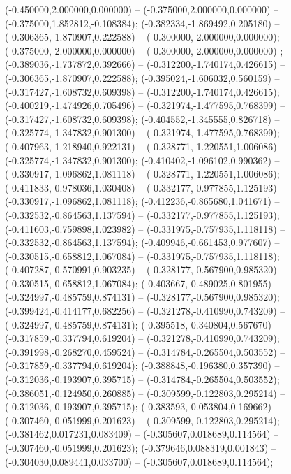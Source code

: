  (-0.450000,2.000000,0.000000) -- (-0.375000,2.000000,0.000000) -- (-0.375000,1.852812,-0.108384);
 (-0.382334,-1.869492,0.205180) -- (-0.306365,-1.870907,0.222588) -- (-0.300000,-2.000000,0.000000);
 (-0.375000,-2.000000,0.000000) -- (-0.300000,-2.000000,0.000000) ;
 (-0.389036,-1.737872,0.392666) -- (-0.312200,-1.740174,0.426615) -- (-0.306365,-1.870907,0.222588);
 (-0.395024,-1.606032,0.560159) -- (-0.317427,-1.608732,0.609398) -- (-0.312200,-1.740174,0.426615);
 (-0.400219,-1.474926,0.705496) -- (-0.321974,-1.477595,0.768399) -- (-0.317427,-1.608732,0.609398);
 (-0.404552,-1.345555,0.826718) -- (-0.325774,-1.347832,0.901300) -- (-0.321974,-1.477595,0.768399);
 (-0.407963,-1.218940,0.922131) -- (-0.328771,-1.220551,1.006086) -- (-0.325774,-1.347832,0.901300);
 (-0.410402,-1.096102,0.990362) -- (-0.330917,-1.096862,1.081118) -- (-0.328771,-1.220551,1.006086);
 (-0.411833,-0.978036,1.030408) -- (-0.332177,-0.977855,1.125193) -- (-0.330917,-1.096862,1.081118);
 (-0.412236,-0.865680,1.041671) -- (-0.332532,-0.864563,1.137594) -- (-0.332177,-0.977855,1.125193);
 (-0.411603,-0.759898,1.023982) -- (-0.331975,-0.757935,1.118118) -- (-0.332532,-0.864563,1.137594);
 (-0.409946,-0.661453,0.977607) -- (-0.330515,-0.658812,1.067084) -- (-0.331975,-0.757935,1.118118);
 (-0.407287,-0.570991,0.903235) -- (-0.328177,-0.567900,0.985320) -- (-0.330515,-0.658812,1.067084);
 (-0.403667,-0.489025,0.801955) -- (-0.324997,-0.485759,0.874131) -- (-0.328177,-0.567900,0.985320);
 (-0.399424,-0.414177,0.682256) -- (-0.321278,-0.410990,0.743209) -- (-0.324997,-0.485759,0.874131);
 (-0.395518,-0.340804,0.567670) -- (-0.317859,-0.337794,0.619204) -- (-0.321278,-0.410990,0.743209);
 (-0.391998,-0.268270,0.459524) -- (-0.314784,-0.265504,0.503552) -- (-0.317859,-0.337794,0.619204);
 (-0.388848,-0.196380,0.357390) -- (-0.312036,-0.193907,0.395715) -- (-0.314784,-0.265504,0.503552);
 (-0.386051,-0.124950,0.260885) -- (-0.309599,-0.122803,0.295214) -- (-0.312036,-0.193907,0.395715);
 (-0.383593,-0.053804,0.169662) -- (-0.307460,-0.051999,0.201623) -- (-0.309599,-0.122803,0.295214);
 (-0.381462,0.017231,0.083409) -- (-0.305607,0.018689,0.114564) -- (-0.307460,-0.051999,0.201623);
 (-0.379646,0.088319,0.001843) -- (-0.304030,0.089441,0.033700) -- (-0.305607,0.018689,0.114564);
